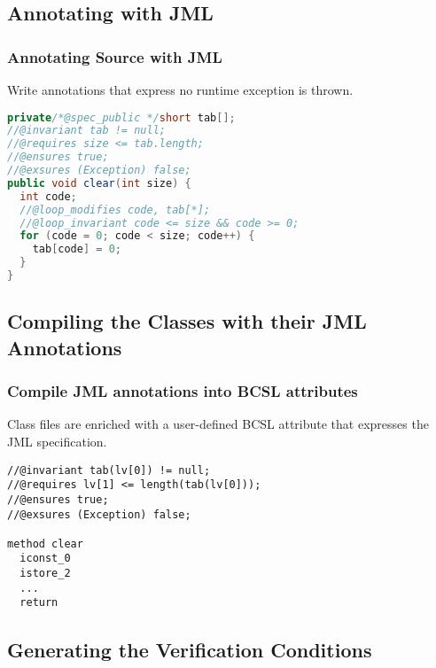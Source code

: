 \documentclass{beamer}
\begin{document}
\subsection{Annotating with JML}

\begin{frame}[fragile]
\frametitle{Annotating Source with JML}

Write annotations that express no runtime exception is thrown.
\begin{lstlisting}[language=java]
private/*@spec_public */short tab[];
//@invariant tab != null;
//@requires size <= tab.length;
//@ensures true;
//@exsures (Exception) false;
public void clear(int size) {
  int code;
  //@loop_modifies code, tab[*];
  //@loop_invariant code <= size && code >= 0;
  for (code = 0; code < size; code++) {
    tab[code] = 0;
  }
}
\end{lstlisting}

\end{frame}

\subsection{Compiling the Classes with their JML Annotations}

\begin{frame}[fragile]
\frametitle{Compile JML annotations into BCSL attributes}

Class files are enriched with a user-defined BCSL attribute that expresses the JML specification.

\begin{lstlisting}[language=jvmis]
//@invariant tab(lv[0]) != null;
//@requires lv[1] <= length(tab(lv[0]));
//@ensures true;
//@exsures (Exception) false;

method clear
  iconst_0
  istore_2
  ...
  return
\end{lstlisting}
\end{frame}

\subsection{Generating the Verification Conditions}
\end{document}
